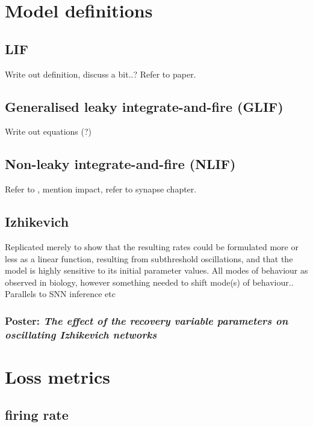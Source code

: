 \documentclass[mphil,deptreport,ai]{infthesis} %
\begin{document}
\section{Model definitions}

\subsection{LIF}

Write out definition, discuss a bit..? Refer to paper.

\subsection{Generalised leaky integrate-and-fire (GLIF)}

Write out equations (?)

\subsection{Non-leaky integrate-and-fire (NLIF)}

Refer to \cite{Huh2017}, mention impact, refer to synapse chapter.

\subsection{Izhikevich}

Replicated \cite{Oliveira2019} merely to show that the resulting rates could be formulated more or less as a linear function, resulting from subthreshold oscillations, and that the model is highly sensitive to its initial parameter values.
All modes of behaviour as observed in biology, however something needed to shift mode(s) of behaviour..
Parallels to SNN inference etc

\subsubsection{Poster: \textit{The effect of the recovery variable parameters on oscillating Izhikevich networks}}



\section{Loss metrics}

\subsection{firing rate}
\end{document}
